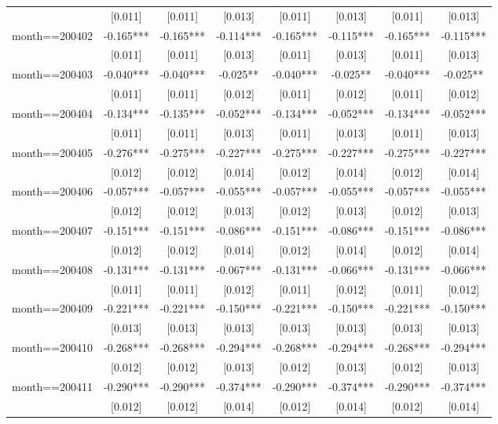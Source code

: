 \documentclass[]{article}
\begin{document}
\begin{tabular}{lccccccc}
 & [0.011] & [0.011] & [0.013] & [0.011] & [0.013] & [0.011] & [0.013] \\
month==200402 & -0.165*** & -0.165*** & -0.114*** & -0.165*** & -0.115*** & -0.165*** & -0.115*** \\
 & [0.011] & [0.011] & [0.013] & [0.011] & [0.013] & [0.011] & [0.013] \\
month==200403 & -0.040*** & -0.040*** & -0.025** & -0.040*** & -0.025** & -0.040*** & -0.025** \\
 & [0.011] & [0.011] & [0.012] & [0.011] & [0.012] & [0.011] & [0.012] \\
month==200404 & -0.134*** & -0.135*** & -0.052*** & -0.134*** & -0.052*** & -0.134*** & -0.052*** \\
 & [0.011] & [0.011] & [0.013] & [0.011] & [0.013] & [0.011] & [0.013] \\
month==200405 & -0.276*** & -0.275*** & -0.227*** & -0.275*** & -0.227*** & -0.275*** & -0.227*** \\
 & [0.012] & [0.012] & [0.014] & [0.012] & [0.014] & [0.012] & [0.014] \\
month==200406 & -0.057*** & -0.057*** & -0.055*** & -0.057*** & -0.055*** & -0.057*** & -0.055*** \\
 & [0.012] & [0.012] & [0.013] & [0.012] & [0.013] & [0.012] & [0.013] \\
month==200407 & -0.151*** & -0.151*** & -0.086*** & -0.151*** & -0.086*** & -0.151*** & -0.086*** \\
 & [0.012] & [0.012] & [0.014] & [0.012] & [0.014] & [0.012] & [0.014] \\
month==200408 & -0.131*** & -0.131*** & -0.067*** & -0.131*** & -0.066*** & -0.131*** & -0.066*** \\
 & [0.011] & [0.011] & [0.012] & [0.011] & [0.012] & [0.011] & [0.012] \\
month==200409 & -0.221*** & -0.221*** & -0.150*** & -0.221*** & -0.150*** & -0.221*** & -0.150*** \\
 & [0.013] & [0.013] & [0.013] & [0.013] & [0.013] & [0.013] & [0.013] \\
month==200410 & -0.268*** & -0.268*** & -0.294*** & -0.268*** & -0.294*** & -0.268*** & -0.294*** \\
 & [0.012] & [0.012] & [0.013] & [0.012] & [0.013] & [0.012] & [0.013] \\
month==200411 & -0.290*** & -0.290*** & -0.374*** & -0.290*** & -0.374*** & -0.290*** & -0.374*** \\
 & [0.012] & [0.012] & [0.014] & [0.012] & [0.014] & [0.012] & [0.014] \\

\end{tabular}
\end{document}
